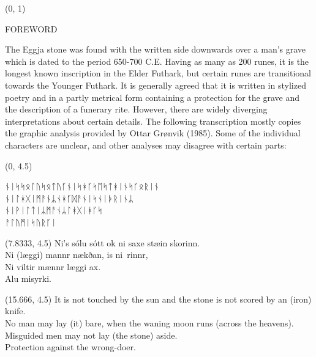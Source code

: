 \documentclass[11pt]{article}
\begin{document}
\begin{textblock}{23}(0, 1)
\begin{center}
\huge FOREWORD
\end{center}
\end{textblock}

\vspace*{0.25\baselineskip}

\begingroup

\begin{center}
The Eggja stone was found with the written side downwards over a man's grave which is dated to the period 650-700 C.E. Having as many as 200 runes, it is the longest known inscription in the Elder Futhark, but certain runes are transitional towards the Younger Futhark. It is generally agreed that it is written in stylized poetry and in a partly metrical form containing a protection for the grave and the description of a funerary rite. However, there are widely diverging interpretations about certain details. The following transcription mostly copies the graphic analysis provided by Ottar Grønvik (1985). Some of the individual characters are unclear, and other analyses may disagree with certain parts:
\rightskip\leftskip
\phantom{text} \hfill \phantom{()}
\end{center}

\begin{textblock}{7.333}(0, 4.5)

\setmainfont{Noto Sans Runic}
ᚾᛁᛋᛋᛟᛚᚢᛋᛟᛏᚢᚴᚾᛁᛋᚼᚴᛋᛖᛋᛏᚼᛁᚾᛋᚴᛟᚱᛁᚾ \\
\hfill \break
ᚾᛁᛚᚼᚷᛁᛗᚨᚾᛦᚾᚼᚴᛞᚨᚾᛁᛋᚾᛁᚦᚱᛁᚾᛦ\\
\hfill \break
ᚾᛁᚹᛁᛚᛏᛁᛦᛗᚨᚾᛦᛚᚼᚷᛁᚼᚴᛋ\\
  \hfill \break
ᚨᛚᚢᛗᛁᛋᚢᚱᚴᛁ\\
\rightskip\leftskip
\phantom{text} \hfill

\end{textblock}

\begin{textblock}{7.333}(7.8333, 4.5)
\setmainfont{Bell MT}
Ni's sólu sótt ok ni saxe stæin skorinn. \\
\hfill \break
Ni (læggi) mannr nækðan, is ni\Thorn \ rinnr, \\
\hfill \break
Ni viltir mænnr læggi ax. \\
\hfill \break
Alu misyrki. \\
\end{textblock}

\begin{textblock}{7.333}(15.666, 4.5)
It is not touched by the sun and the stone is not scored by an (iron) knife. \\
No man may lay (it) bare, when the waning moon runs (across the heavens). \\
Misguided men may not lay (the stone) aside. \\
\hfill \break
Protection against the wrong-doer.
\end{textblock}
\end{document}
